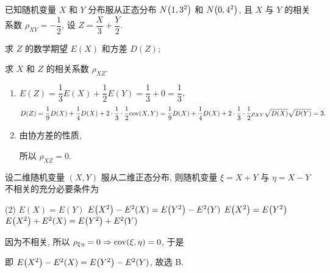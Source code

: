 \begin{example}[1994 数一]
    已知随机变量 $X$ 和 $Y$ 分布服从正态分布 $N\qty(1,3^2)$ 和 $N\qty(0,4^2)$, 且 $X$ 与 $Y$ 的相关系数 $\rho_{XY}=-\dfrac{1}{2}$, 
    设 $Z=\dfrac{X}{3}+\dfrac{Y}{2}$.\newline
    \begin{enumerate*}[label=(\arabic{*})]
        \item 求 $Z$ 的数学期望 $E(X)$ 和方差 $D(Z)$;
        \item 求 $X$ 和 $Z$ 的相关系数 $\rho_{XZ}.$
    \end{enumerate*}
\end{example}
\begin{solution}
    \begin{enumerate}[label=(\arabic{*})]
        \item $E(Z)=\dfrac{1}{3}E(X)+\dfrac{1}{2}E(Y)=\dfrac{1}{3}+0=\dfrac{1}{3}$, 
              $$D(Z)=\dfrac{1}{9}D(X)+\dfrac{1}{4}D(X)+2\cdot\dfrac{1}{3}\cdot\dfrac{1}{2}\mathrm{cov}(X,Y)=\dfrac{1}{9}D(X)+\dfrac{1}{4}D(X)+2\cdot\dfrac{1}{3}\cdot\dfrac{1}{2}\rho_{XY}\sqrt{D(X)}\sqrt{D(Y)}=3.$$
        \item 由协方差的性质, 
              所以 $\rho_{XZ}=0.$
    \end{enumerate}
\end{solution}

\begin{example}[2000 数一]
    设二维随机变量 $(X,Y)$ 服从二维正态分布, 则随机变量 $\xi=X+Y$ 与 $\eta=X-Y$ 不相关的充分必要条件为
    \begin{tasks}(2)
        \task $E(X)=E(Y)$
        \task $E\qty(X^2)-E^2(X)=E\qty(Y^2)-E^2(Y)$
        \task $E\qty(X^2)=E\qty(Y^2)$
        \task $E\qty(X^2)+E^2(X)=E\qty(Y^2)+E^2(Y)$
    \end{tasks}
\end{example}
\begin{solution}
    因为不相关, 所以 $\rho_{\xi\eta}=0\Rightarrow \mathrm{cov}(\xi,\eta)=0$, 于是
    即 $E\qty(X^2)-E^2(X)=E\qty(Y^2)-E^2(Y)$, 故选 B.
\end{solution}

